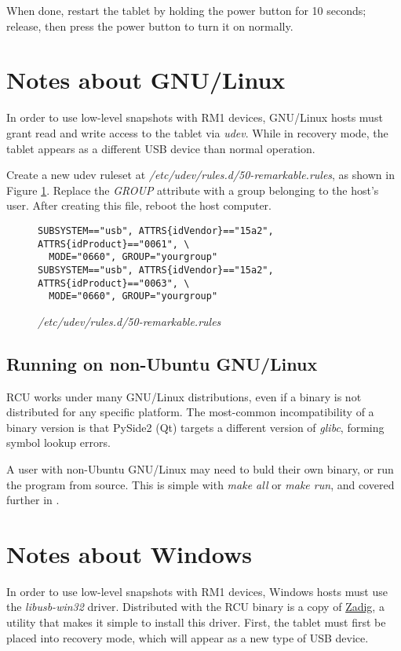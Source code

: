 When done, restart the tablet by holding the power button for 10 seconds; release, then press the power button to turn it on normally.


\section{Notes about GNU/Linux}
\label{sec:linnotes}
In order to use low-level snapshots with RM1 devices, GNU/Linux hosts must grant read and write access to the tablet via \textit{udev}. While in recovery mode, the tablet appears as a different USB device than normal operation.

Create a new udev ruleset at \textit{/etc/udev/rules.d/50-remarkable.rules}, as shown in Figure \ref{fig:udevrules}. Replace the \textit{GROUP} attribute with a group belonging to the host's user. After creating this file, reboot the host computer.

\begin{figure}[h]
\begin{verbatim}
SUBSYSTEM=="usb", ATTRS{idVendor}=="15a2", ATTRS{idProduct}=="0061", \
  MODE="0660", GROUP="yourgroup"
SUBSYSTEM=="usb", ATTRS{idVendor}=="15a2", ATTRS{idProduct}=="0063", \
  MODE="0660", GROUP="yourgroup"
\end{verbatim}
\caption{\textit{/etc/udev/rules.d/50-remarkable.rules}}
\label{fig:udevrules}
\end{figure}

\subsection{Running on non-Ubuntu GNU/Linux}
RCU works under many GNU/Linux distributions, even if a binary is not distributed for any specific platform. The most-common incompatibility of a binary version is that PySide2 (Qt) targets a different version of \textit{glibc}, forming symbol lookup errors.

A user with non-Ubuntu GNU/Linux may need to buld their own binary, or run the program from source. This is simple with \textit{make all} or \textit{make run}, and covered further in \nameref{sec:developing}.


\newpage
\section{Notes about Windows}
\label{sec:winnotes}
In order to use low-level snapshots with RM1 devices, Windows hosts must use the \textit{libusb-win32} driver. Distributed with the RCU binary is a copy of \href{https://zadig.akeo.ie/}{Zadig}, a utility that makes it simple to install this driver. First, the tablet must first be placed into recovery mode, which will appear as a new type of USB device.

